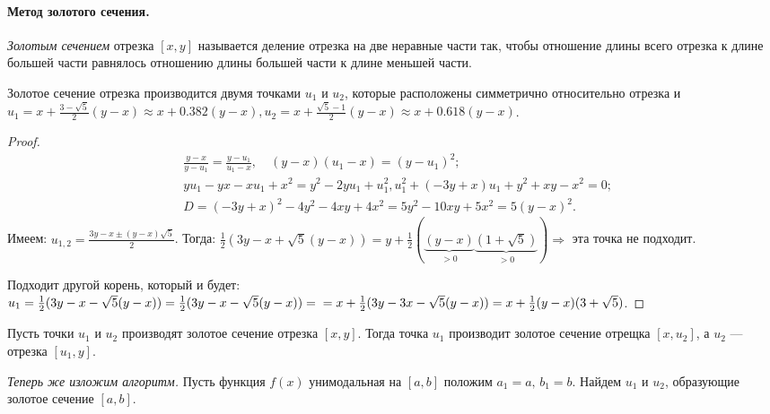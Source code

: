 
\paragraph{Метод золотого сечения. } 
\begin{definition}
	\textit{Золотым сечением} отрезка $[x, y]$ называется деление отрезка на две неравные части так, чтобы отношение длины всего отрезка к длине большей части равнялось отношению длины большей части к длине меньшей части. 
\end{definition}

\begin{utv}
	Золотое сечение отрезка производится двумя точками $u_1$ и $u_2$, которые расположены симметрично относительно отрезка и $u_1 = x + \frac{3 - \sqrt{5}}{2} (y - x) \approx x + 0.382 (y - x), u_2 = x + \frac{\sqrt{5} - 1}{2} (y - x) \approx x + 0.618 (y - x)$.
\end{utv}
\begin{proof}
	\begin{align*}
		&\frac{y - x}{y - u_1} = \frac{y - u_1}{u_1 - x}, \quad (y - x) (u_1 - x) = (y - u_1)^2; \\ &y u_1 - y x - x u_1 + x^2 = y^2 - 2 y u_1 + u_1^2,
		u_1^2 + (-3 y + x) u_1 + y^2 + x y - x^2 = 0; \\ &D = (-3 y + x)^2 - 4 y^2 - 4 xy + 4 x^2 = 5 y^2 - 10 xy + 5 x^2 = 5 (y - x)^2.
	\end{align*}
	Имеем: $u_{1, 2} = \frac{3 y - x \pm (y - x) \sqrt{5}}{2}$. Тогда:
	$\frac{1}{2} (3 y - x + \sqrt{5} (y - x)) = y + \frac{1}{2} (\underbrace{(y - x)}_{>0} \underbrace{(1 + \sqrt{5})}_{>0}) \Rightarrow$ эта точка не подходит.
	
	Подходит другой корень, который и будет: $u_1 = \frac{1}{2} (3 y - x - \sqrt{5} (y - x)) = \frac{1}{2} (3 y - x - \sqrt{5} (y - x)) = \\ = x + \frac{1}{2} (3 y - 3 x - \sqrt{5}(y - x)) = x + \frac{1}{2} (y - x) (3 + \sqrt{5})$.
\end{proof}

\begin{utv}
	Пусть точки $u_1$ и $u_2$ производят золотое сечение отрезка $[x, y]$. Тогда точка $u_1$ производит золотое сечение отрещка $[x, u_2]$, а $u_2$ --- отрезка $[u_1, y]$.
\end{utv}

\textit{Теперь же изложим алгоритм.} Пусть функция $f(x)$ унимодальная на $[a, b]$ положим $a_1 = a, \, b_1 = b$. Найдем $u_1$ и $u_2$, образующие золотое сечение $[a, b]$.

